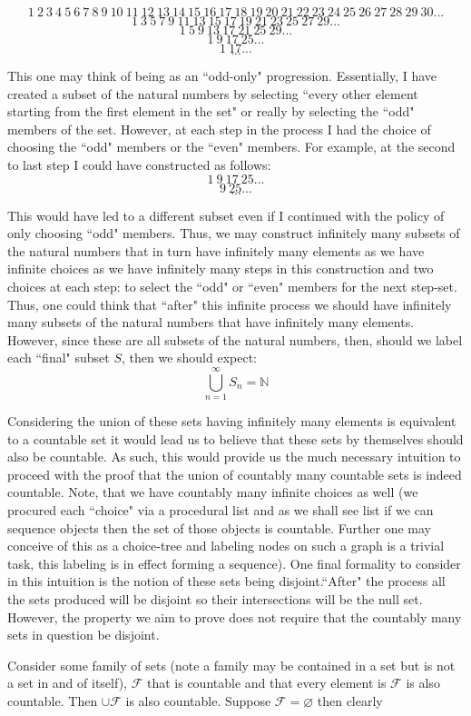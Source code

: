 \documentclass{article}
\begin{document}
\[
1\:2\:3\:4\:5\:6\:7\:8\:9\:10\:11\:12\:13\:14\:15\:16\:17\:18\:19\:20\:21\:22\:23\:24\:25\:26\:27\:28\:29\:30...
\]
\[
1\:3\:5\:7\:9\:11\:13\:15\:17\:19\:21\:23\:25\:27\:29...
\]
\[
1\:5\:9\:13\:17\:21\:25\:29...
\]
\[
1\:9\:17\:25...
\]
\[
1\:17...
\]
\[
.
.
.
\]
\par This one may think of being as an ``odd-only" progression. Essentially, I have created a subset of the natural numbers by selecting ``every other element starting from the first element in the set" or really by selecting the ``odd" members of the set. However, at each step in the process I had the choice of choosing the ``odd" members or the ``even" members. For example, at the second to last step I could have constructed as follows:
\[
1\:9\:17\:25...
\]
\[
9\:25...
\]
\[
.
.
.
\]
\par This would have led to a different subset even if I continued with the policy of only choosing ``odd" members. Thus, we may construct infinitely many subsets of the natural numbers that in turn have infinitely many elements as we have infinite choices as we have infinitely many steps in this construction and two choices at each step: to select the ``odd" or ``even" members for the next step-set. Thus, one could think that ``after" this infinite process we should have infinitely many subsets of the natural numbers that have infinitely many elements. However, since these are all subsets of the natural numbers, then, should we label each ``final" subset $S$, then we should expect:
\[
\bigcup_{n=1}^{\infty} S_{n}=\mathbb{N}
\]
\par Considering the union of these sets having infinitely many elements is equivalent to a countable set it would lead us to believe that these sets by themselves should also be countable. As such, this would provide us the much necessary intuition to proceed with the proof that the union of countably many countable sets is indeed countable. Note, that we have countably many infinite choices as well (we procured each ``choice" via a procedural list and as we shall see list if we can sequence objects then the set of those objects is countable. Further one may conceive of this as a choice-tree and labeling nodes on such a graph is a trivial task, this labeling is in effect forming a sequence). One final formality to consider in this intuition is the notion of these sets being disjoint.``After" the process all the sets produced will be disjoint so their intersections will be the null set. However, the property we aim to prove does not require that the countably many sets in question be disjoint.
\par Consider some family of sets (note a family may be contained in a set but is not a set in and of itself), $\mathcal{F}$ that is countable and that every element is $\mathcal{F}$ is also countable. Then $\cup \mathcal{F}$ is also countable. Suppose $\mathcal{F} = \varnothing$ then clearly
\end{document}
